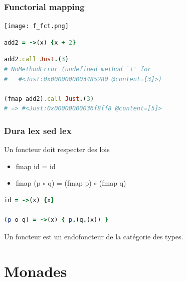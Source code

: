 \documentclass{beamer}
\begin{document}
\begin{frame}[fragile]
\frametitle{Functorial mapping}
\begin{center}
\texttt{[image: f\_fct.png]}
\end{center}
\begin{block}{}
\begin{lstlisting}[language=ruby,basicstyle=\ttfamily,keywordstyle=\color{red}]
add2 = ->(x) {x + 2}
\end{lstlisting}
\end{block}

\begin{block}{}
\begin{lstlisting}[language=ruby,basicstyle=\ttfamily]
add2.call Just.(3)
# NoMethodError (undefined method `+' for
#   #<Just:0x0000000003485280 @content=[3]>)

(fmap add2).call Just.(3)
# => #<Just:0x00000000036f8ff8 @content=[5]>
\end{lstlisting}
\end{block}
\end{frame}



\begin{frame}[fragile]
\frametitle{Dura lex sed lex}
\begin{alertblock}{Un foncteur doit respecter des lois}
\begin{itemize}
\item fmap id = id
\item fmap (p $\circ$ q) = (fmap p) $\circ$ (fmap q)

\end{itemize}
\end{alertblock}
\pause
\begin{block}{}
\begin{lstlisting}[language=ruby]
id = ->(x) {x}

(p o q) = ->(x) { p.(q.(x)) }
\end{lstlisting}
\end{block}

\pause
Un foncteur est un endofoncteur de la catégorie des types.
\end{frame}

\section{Monades}
\end{document}
